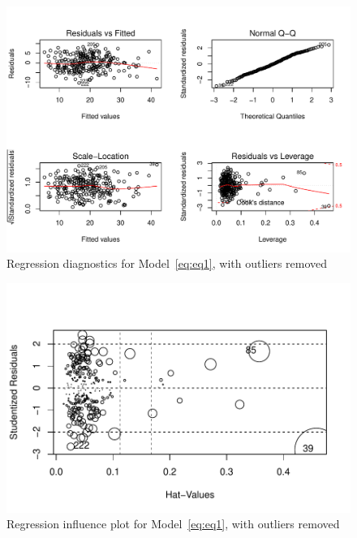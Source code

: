 \documentclass[11pt,letter]{article}\usepackage[]{graphicx}\usepackage[]{color}
\makeatletter
\def\maxwidth{ %
  \ifdim\Gin@nat@width>\linewidth
    \linewidth
  \else
    \Gin@nat@width
  \fi
}
\newenvironment{knitrout}{}{} %
\makeatother
\begin{document}
\begin{knitrout}
\color{fgcolor}\begin{figure}[h]

{\centering \includegraphics[width=\maxwidth]{figure/fig-diagnostics2-1} 

}

\caption{Regression diagnostics for Model~\eqref{eq:eq1}, with outliers removed}\label{fig:fig-diagnostics2}
\end{figure}


\end{knitrout}

\begin{knitrout}
\color{fgcolor}\begin{figure}[h]

{\centering \includegraphics[width=\maxwidth]{figure/influence-plot2-1} 

}

\caption{Regression influence plot for Model~\eqref{eq:eq1}, with outliers removed}\label{fig:influence-plot2}
\end{figure}


\end{knitrout}
\end{document}
